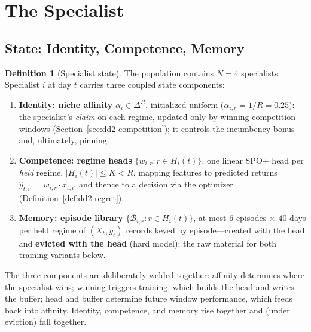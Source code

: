 \documentclass[11pt,a4paper]{article}
\theoremstyle{definition}
\newtheorem{definition}{Definition}[section]
\theoremstyle{plain}
\begin{document}
\section{The Specialist}
\label{sec:dd2-specialist}

\subsection{State: Identity, Competence, Memory}

\begin{definition}[Specialist state]
\label{def:dd2-specialist}
The population contains $N = 4$ specialists. Specialist $i$ at day $t$
carries three coupled state components:
\begin{enumerate}
  \item \textbf{Identity: niche affinity} $\alpha_i \in \Delta^{R}$,
        initialized uniform ($\alpha_{i,r} = 1/R = 0.25$): the specialist's
        \emph{claim} on each regime, updated only by winning competition
        windows (Section~\ref{sec:dd2-competition}); it controls the
        incumbency bonus and, ultimately, pinning.
  \item \textbf{Competence: regime heads} $\{w_{i,r} : r \in H_i(t)\}$, one
        linear SPO+ head per \emph{held} regime, $|H_i(t)| \le K < R$,
        mapping features to predicted returns
        $\hat y_{t,i'} = w_{i,r} \cdot x_{t,i'}$ and thence to a decision
        via the optimizer (Definition~\ref{def:dd2-regret}).
  \item \textbf{Memory: episode library}
        $\{\mathcal{B}_{i,r} : r \in H_i(t)\}$, at most $6$ episodes
        $\times$ $40$ days per held regime of $(X_t, y_t)$ records keyed by
        episode---created with the head and \textbf{evicted with the head}
        (hard model); the raw material for both training variants below.
\end{enumerate}
\end{definition}

The three components are deliberately welded together: affinity determines
where the specialist wins; winning triggers training, which builds the head
and writes the buffer; head and buffer determine future window performance,
which feeds back into affinity. Identity, competence, and memory rise
together and (under eviction) fall together.
\end{document}
